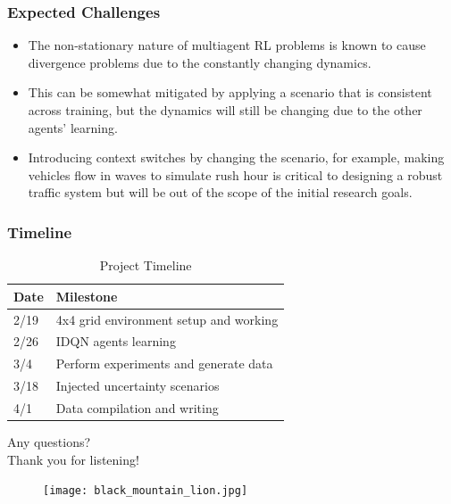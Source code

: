 \documentclass[compress,12pt]{beamer}
\begin{document}
\begin{frame}[bg=arguelles.png]
      \frametitle{Expected Challenges}
      \begin{itemize}
      \item The non-stationary nature of multiagent RL problems is known to cause divergence problems due to the constantly changing dynamics.
      \item This can be somewhat mitigated by applying a scenario that is consistent across training, but the dynamics will still be changing due to the other agents' learning.
      \item Introducing context switches by changing the scenario, for example, making vehicles flow in waves to simulate rush hour is critical to designing a robust traffic system but will be out of the scope of the initial research goals.
      \end{itemize}
\end{frame}

\begin{frame}[bg=arguelles.png]
      \frametitle{Timeline}

    \begin{table}[H]
    \centering
    \begin{tabular}{ll}
    \hline
    \textbf{Date} & \textbf{Milestone}             \\ \hline
    2/19 & 4x4 grid environment setup and working  \\
    2/26 & IDQN agents learning                    \\
    3/4  & Perform experiments and generate data   \\
    3/18 & Injected uncertainty scenarios          \\
    4/1  & Data compilation and writing            \\ \hline
    \end{tabular}
    \caption{Project Timeline}
    \label{tab:project_timeline}
    \end{table}

\end{frame}

\begin{frame}
      \centering
      Any questions? \\
      Thank you for listening!
      \vfill
    \begin{figure}[htbp]
      \centering
      \texttt{[image: black\_mountain\_lion.jpg]}
    \end{figure}
\end{frame}
\end{document}
